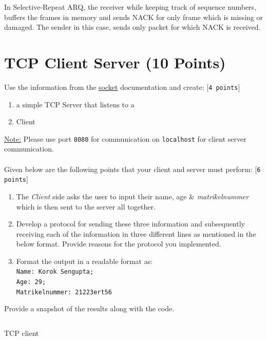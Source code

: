 \documentclass{WeSTassignment}
\begin{document}
In Selective-Repeat ARQ, the receiver while keeping track of sequence numbers, buffers the frames in memory and sends NACK for only frame which is missing or damaged.
The sender in this case, sends only packet for which NACK is received.




\section{TCP Client Server (10 Points)}

Use the information from the \href{https://docs.python.org/3/howto/sockets.html}{socket} documentation and create: [\texttt{4 points}]
\begin{enumerate}
\item a simple TCP Server that listens to a
\item Client
\end{enumerate}
\underline{Note:} Please use port \texttt{8080} for communication on \texttt{localhost} for client server communication.\\ \\
Given below are the following points that your client and server must perform: [\texttt{6 points}]
\begin{enumerate}
\item The \emph{Client} side asks the user to input their name, age \& \emph{matrikelnummer} which is then sent to the server all together.
\item Develop a protocol for sending these three information and subsequently receiving each of the information in three different lines as mentioned in the below format. Provide reasons for the protocol you implemented. 
\item Format the output in a readable format as:\texttt{\\ Name: Korok Sengupta; \\ Age: 29; \\ Matrikelnummer: 21223ert56}
\end{enumerate}

Provide a snapshot of the results along with the code. \\

\begin{listing}
	\centering
	\inputminted{python}{tango_assignment2_4_client.py}
    \caption{TCP client}
\end{listing}
\end{document}
